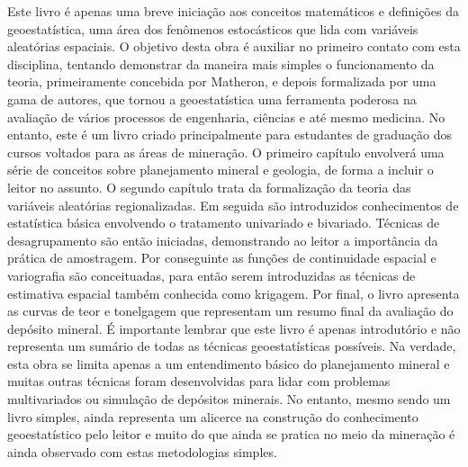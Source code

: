 \documentclass[11pt,fleqn]{book} %
\begin{document}
Este livro é apenas uma breve iniciação aos conceitos matemáticos e definições da geoestatística, uma área dos fenômenos estocásticos que lida com variáveis aleatórias espaciais. O objetivo desta obra é auxiliar no primeiro contato com esta disciplina, tentando demonstrar da maneira mais simples o funcionamento da teoria, primeiramente concebida por Matheron, e depois formalizada por uma gama de autores, que tornou a geoestatística uma ferramenta poderosa na avaliação de vários processos de engenharia, ciências e até mesmo medicina. No entanto, este é um livro criado principalmente para estudantes de graduação dos cursos voltados para as áreas de mineração. O primeiro capítulo envolverá uma série de conceitos sobre planejamento mineral e geologia, de forma a incluir o leitor no assunto. O segundo capítulo trata da formalização da teoria das variáveis aleatórias regionalizadas. Em seguida são introduzidos conhecimentos de estatística básica envolvendo o tratamento univariado e bivariado. Técnicas de desagrupamento são então iniciadas, demonstrando ao leitor a importância da prática de amostragem. Por conseguinte as funções de continuidade espacial e variografia são conceituadas, para então serem introduzidas as técnicas de estimativa espacial também conhecida como krigagem. Por final, o livro apresenta as curvas de teor e tonelgagem que representam um resumo final da avaliação do depósito mineral. É importante lembrar que este livro é apenas introdutório e não representa um sumário de todas as técnicas geoestatísticas possíveis. Na verdade, esta obra se limita apenas a um entendimento básico do planejamento mineral e muitas outras técnicas foram desenvolvidas para lidar com problemas multivariados ou simulação de depósitos minerais. No entanto, mesmo sendo um livro simples, ainda representa um alicerce na construção do conhecimento geoestatístico pelo leitor e muito do que ainda se pratica no meio da mineração é ainda observado com estas metodologias simples. 


\



\pagestyle{empty} %
\end{document}
